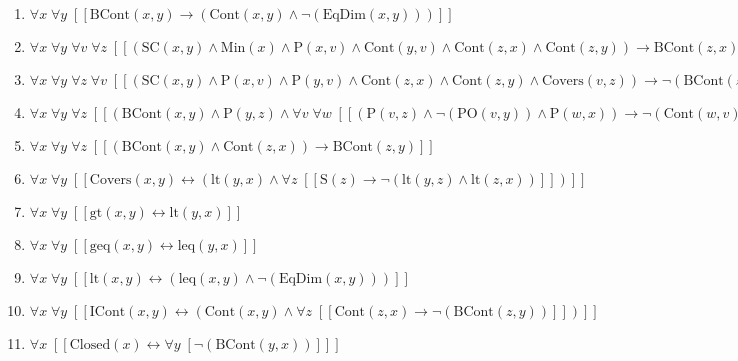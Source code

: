 \documentclass{article}
\begin{document}
\begin{enumerate}
\item $\forall x\; \forall y\;  \left[ \left[ \textrm{BCont}(x,y) \rightarrow \left(\textrm{Cont}(x,y) \land \neg \left(\textrm{EqDim}(x,y)\right)\right) \right] \right]$
\item $\forall x\; \forall y\; \forall v\; \forall z\;  \left[ \left[ \left(\textrm{SC}(x,y) \land \textrm{Min}(x) \land \textrm{P}(x,v) \land \textrm{Cont}(y,v) \land \textrm{Cont}(z,x) \land \textrm{Cont}(z,y)\right) \rightarrow \textrm{BCont}(z,x) \right] \right]$
\item $\forall x\; \forall y\; \forall z\; \forall v\;  \left[ \left[ \left(\textrm{SC}(x,y) \land \textrm{P}(x,v) \land \textrm{P}(y,v) \land \textrm{Cont}(z,x) \land \textrm{Cont}(z,y) \land \textrm{Covers}(v,z)\right) \rightarrow \neg \left(\textrm{BCont}(z,v)\right) \right] \right]$
\item $\forall x\; \forall y\; \forall z\;  \left[ \left[ \left(\textrm{BCont}(x,y) \land \textrm{P}(y,z) \land \forall v\; \forall w\;  \left[ \left[ \left(\textrm{P}(v,z) \land \neg \left(\textrm{PO}(v,y)\right) \land \textrm{P}(w,x)\right) \rightarrow \neg \left(\textrm{Cont}(w,v)\right) \right] \right]\right) \rightarrow \textrm{BCont}(x,z) \right] \right]$
\item $\forall x\; \forall y\; \forall z\;  \left[ \left[ \left(\textrm{BCont}(x,y) \land \textrm{Cont}(z,x)\right) \rightarrow \textrm{BCont}(z,y) \right] \right]$
\item $\forall x\; \forall y\;  \left[ \left[ \textrm{Covers}(x,y) \leftrightarrow \left(\textrm{lt}(y,x) \land \forall z\;  \left[ \left[ \textrm{S}(z) \rightarrow \neg \left(\textrm{lt}(y,z) \land \textrm{lt}(z,x)\right) \right] \right]\right) \right] \right]$
\item $\forall x\; \forall y\;  \left[ \left[ \textrm{gt}(x,y) \leftrightarrow \textrm{lt}(y,x) \right] \right]$
\item $\forall x\; \forall y\;  \left[ \left[ \textrm{geq}(x,y) \leftrightarrow \textrm{leq}(y,x) \right] \right]$
\item $\forall x\; \forall y\;  \left[ \left[ \textrm{lt}(x,y) \leftrightarrow \left(\textrm{leq}(x,y) \land \neg \left(\textrm{EqDim}(x,y)\right)\right) \right] \right]$
\item $\forall x\; \forall y\;  \left[ \left[ \textrm{ICont}(x,y) \leftrightarrow \left(\textrm{Cont}(x,y) \land \forall z\;  \left[ \left[ \textrm{Cont}(z,x) \rightarrow \neg \left(\textrm{BCont}(z,y)\right) \right] \right]\right) \right] \right]$
\item $\forall x\;  \left[ \left[ \textrm{Closed}(x) \leftrightarrow \forall y\;  \left[ \neg \left(\textrm{BCont}(y,x)\right) \right] \right] \right]$

\end{enumerate}
\end{document}
